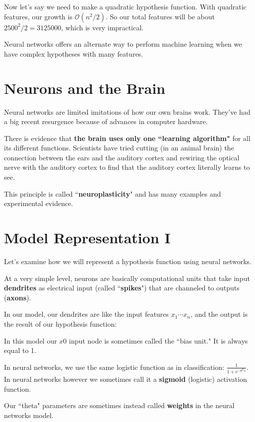 Now let's say we need to make a quadratic hypothesis function. With quadratic features, our growth is $\mathcal{O}(n^2/2)$. So our total features will be about $2500^2 / 2 = 3125000 $, which is very impractical.

Neural networks offers an alternate way to perform machine learning when we have complex hypotheses with many features.

\section{Neurons and the Brain}

Neural networks are limited imitations of how our own brains work. They've had a big recent resurgence because of advances in computer hardware.

There is evidence that \textbf{the brain uses only one ``learning algorithm"} for all its different functions. Scientists have tried cutting (in an animal brain) the connection between the ears and the auditory cortex and rewiring the optical nerve with the auditory cortex to find that the auditory cortex literally learns to see.

This principle is called ``\textbf{neuroplasticity}" and has many examples and experimental evidence.

\section{Model Representation I}
Let's examine how we will represent a hypothesis function using neural networks.

At a very simple level, neurons are basically computational units that take input \textbf{dendrites} as electrical input (called ``\textbf{spikes}") that are channeled to outputs (\textbf{axons}).

In our model, our dendrites are like the input features $x_1\cdots x_n$, and the output is the result of our hypothesis function:

In this model our $x0$ input node is sometimes called the ``bias unit." It is always equal to 1.

In neural networks, we use the same logistic function as in classification: $\frac{1}{1 + e^{-\theta^Tx}} $. In neural networks however we sometimes call it a \textbf{sigmoid} (logistic) activation function.

Our ``theta" parameters are sometimes instead called \textbf{weights} in the neural networks model.

